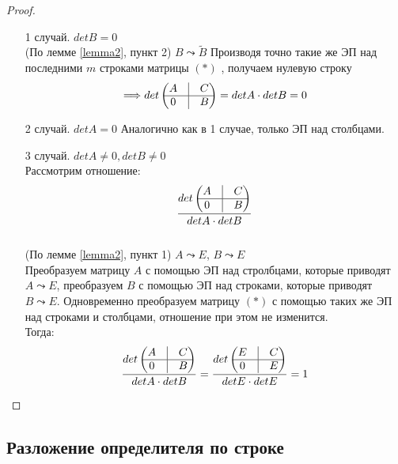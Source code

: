 \documentclass[a4paper, 12pt]{article}
\newcommand\tab[1][.5cm]{\hspace*{#1}}
\theoremstyle{definition}
\begin{document}
  \begin{proof} \tab
    \begin{itemize}
      \item[1 случай.] $detB = 0$ \\
      (По лемме \eqref{lemma2}, пункт 2) $B\leadsto \widetilde{B}$ 
      Производя точно такие же ЭП над последними $m$ строками матрицы $(*)$ , получаем нулевую строку $$\Longrightarrow det \begin{pmatrix}
        A & \vline & C \\
        \hline
        0 & \vline & B
      \end{pmatrix} = detA \cdot detB = 0$$  
      \item[2 случай.] $detA = 0$ Аналогично как в 1 случае, только ЭП над столбцами. 
      \item[3 случай.] $detA \not = 0, detB \not = 0$ \\
      Рассмотрим отношение:
      $$\frac{det \begin{pmatrix}
        A & \vline & C \\
        \hline
        0 & \vline & B
      \end{pmatrix}}{detA \cdot detB}$$\\ (По лемме \eqref{lemma2}, пункт 1) $A\leadsto E$, $B\leadsto E$ \\
      Преобразуем матрицу $A$ с помощью ЭП над стролбцами, которые приводят $A \leadsto E$, преобразуем $B$ с помощью ЭП над строками, которые приводят $B \leadsto E$. Одновременно преобразуем матрицу $(*)$ с помощью таких же ЭП над строками и столбцами, отношение при этом не изменится. \\
      Тогда: 
      $$\frac{det \begin{pmatrix}
        A & \vline & C \\
        \hline
        0 & \vline & B
      \end{pmatrix}}{detA \cdot detB} =
      \frac{det \begin{pmatrix}
        E & \vline & C \\
        \hline
        0 & \vline & E
      \end{pmatrix}}{detE \cdot detE} = 1$$    
    \end{itemize}
  \end{proof} 

  \subsection{Разложение определителя по строке}
\end{document}
